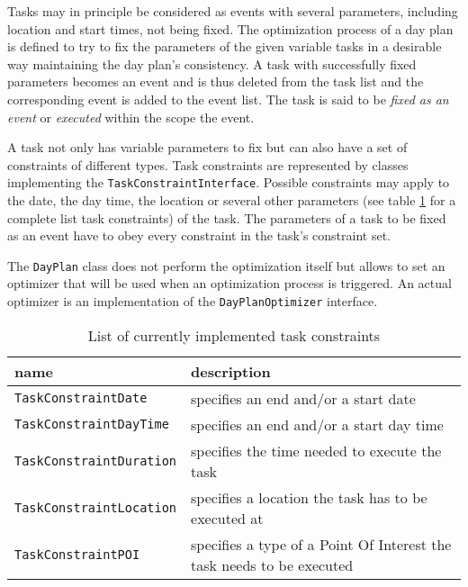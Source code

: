 Tasks may in principle be considered as events with several parameters, including location and start times, not being fixed. The optimization process of a day plan is defined to try to fix the parameters of the given variable tasks in a desirable way maintaining the day plan's consistency. A task with successfully fixed parameters becomes an event and is thus deleted from the task list and the corresponding event is added to the event list. The task is said to be \emph{fixed as an event} or \emph{executed} within the scope the event.\newline

A task not only has variable parameters to fix but can also have a set of constraints of different types. Task constraints are represented by classes implementing the \texttt{TaskConstraintInterface}. Possible constraints may apply to the date, the day time, the location or several other parameters (see table \ref{tab:dayplan_optimization_constraints} for a complete list task constraints) of the task. The parameters of a task to be fixed as an event have to obey every constraint in the task's constraint set.\newline

The \texttt{DayPlan} class does not perform the optimization itself but allows to set an optimizer that will be used when an optimization process is triggered. An actual optimizer is an implementation of the \texttt{DayPlanOptimizer} interface.\newline

\begin{table}[h!]
	\centering	
	\begin{tabular}[ht]{|p{4.5cm}|p{8.5cm}|}
		\hline
		name & description \\
		\hline\hline
		\texttt{TaskConstraintDate} & specifies an end and/or a start date\\
		\texttt{TaskConstraintDayTime} & specifies an end and/or a start day time\\
		\texttt{TaskConstraintDuration} & specifies the time needed to execute the task\\
		\texttt{TaskConstraintLocation} & specifies a location the task has to be executed at\\
		\texttt{TaskConstraintPOI} & specifies a type of a Point Of Interest the task needs to be executed\\	
		\hline
	\end{tabular}
	\caption{List of currently implemented task constraints}
	\label{tab:dayplan_optimization_constraints}
\end{table}

